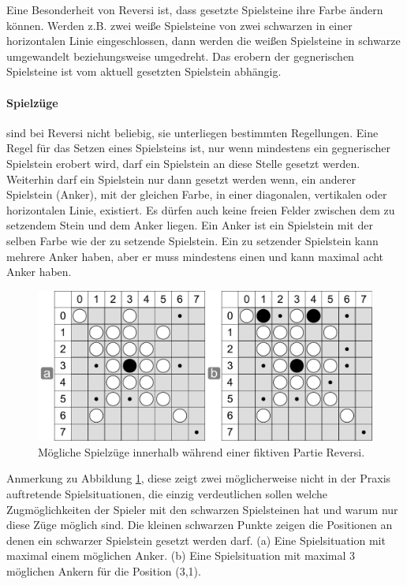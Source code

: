 Eine Besonderheit von Reversi ist, dass gesetzte Spielsteine ihre Farbe ändern können. Werden z.B. zwei weiße Spielsteine von zwei schwarzen in einer horizontalen Linie eingeschlossen, dann werden die weißen Spielsteine in schwarze umgewandelt beziehungsweise umgedreht. Das erobern der gegnerischen Spielsteine ist vom aktuell gesetzten Spielstein abhängig. 

\paragraph{Spielzüge} sind bei Reversi nicht beliebig, sie unterliegen bestimmten Regellungen. Eine Regel für das Setzen eines Spielsteins ist, nur wenn mindestens ein gegnerischer Spielstein erobert wird, darf ein Spielstein an diese Stelle gesetzt werden. Weiterhin  darf ein Spielstein nur dann gesetzt werden wenn, ein anderer Spielstein (Anker), mit der gleichen Farbe, in einer diagonalen, vertikalen oder horizontalen Linie, existiert. Es dürfen auch keine freien Felder zwischen dem zu setzendem Stein und dem Anker liegen. Ein Anker ist ein Spielstein mit der selben Farbe wie der zu setzende Spielstein. Ein zu setzender Spielstein kann mehrere Anker haben, aber er muss mindestens einen und kann maximal acht Anker haben.\\

\begin{figure}[!htbp]
  \centering
  \includegraphics[scale=0.5]{inhalt/abbildungen/zuege_schwarz_reversi.pdf}
  \caption{Mögliche Spielzüge innerhalb während einer fiktiven Partie Reversi.}
  \label{fig:zuege_schwarz_reversi}
\end{figure}

Anmerkung zu Abbildung \ref{fig:zuege_schwarz_reversi}, diese zeigt zwei möglicherweise nicht in der Praxis auftretende Spielsituationen, die einzig verdeutlichen sollen welche Zugmöglichkeiten der Spieler mit den schwarzen Spielsteinen hat und warum nur diese Züge möglich sind. Die kleinen schwarzen Punkte zeigen die Positionen an denen ein schwarzer Spielstein gesetzt werden darf. (a) Eine Spielsituation mit maximal einem möglichen Anker. (b) Eine Spielsituation mit maximal 3 möglichen Ankern für die Position (3,1). \\

